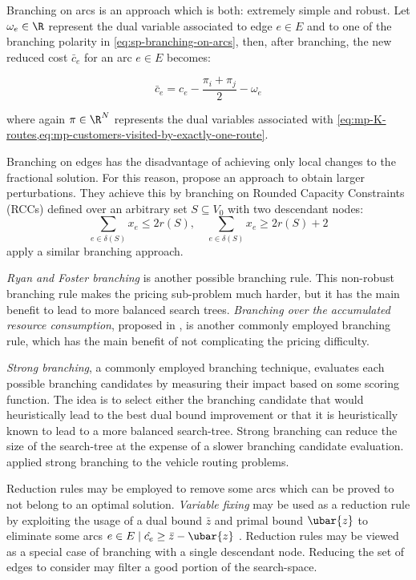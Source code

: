 Branching on arcs is an approach which is both: extremely simple and robust.
Let $\omega_e \in \R$ represent the dual variable associated to
edge $e \in E$ and to
one of the branching polarity in \cref{eq:sp-branching-on-arcs},
then, after branching,
the new reduced cost $\bar{c}_e$ for an arc $e \in E$ becomes:

\begin{equation}
\bar{c}_e = c_e - \frac{\pi_i + \pi_j}{2} - \omega_e
\end{equation}

where again $\pi \in \R^N$ represents the dual variables associated with \cref{eq:mp-K-routes,eq:mp-customers-visited-by-exactly-one-route}.

Branching on edges has the disadvantage of achieving only local changes
to the fractional solution.
For this reason, \textcite{augerat1998} propose an
approach to obtain larger perturbations.
They achieve this by branching on Rounded Capacity Constraints (RCCs) defined over
an arbitrary set $S \subseteq V_0$ with two descendant nodes:
\begin{equation}\label{eq:sp-branching-on-cutsets}
	\sum_{e \in \delta(S)}x_e \le 2 r(S), \quad
	\sum_{e \in \delta(S)}x_e \ge 2 r(S) + 2
\end{equation}
\textcite{pecin2017} apply a similar branching approach.

\textit{Ryan and Foster branching} \parencite{ryan1981} is another possible branching rule.
This non-robust branching rule makes the pricing sub-problem much harder,
but it has the main benefit to lead to more balanced search trees.
\textit{Branching over the accumulated resource consumption}, proposed in \textcite{gelinas1995new},
is another commonly employed branching rule, which has the main benefit of not complicating
the pricing difficulty.


\textit{Strong branching}, a commonly employed branching technique,
evaluates each possible branching candidates
by measuring their impact based on some scoring function.
The idea is to select either the branching candidate that
would heuristically lead to the best dual bound improvement
or that it is heuristically known to lead to a more balanced search-tree.
Strong branching can reduce the size of the search-tree
at the expense of a slower branching candidate evaluation.
\textcite{fukasawa2006, pecin2017a, pecin2017b} applied strong branching
to the vehicle routing problems.

\medskip

Reduction rules may be employed to remove some arcs
which can be proved to not belong to an optimal solution.
\textit{Variable fixing} may be used as a reduction rule by exploiting
the usage of a dual bound $\bar{z}$ and primal bound $\ubar{z}$ to eliminate some
arcs $e \in E \mid \hat{c_e} \ge \bar{z} - \ubar{z}$ \parencite{hadjar2006, irnich2010}.
Reduction rules may be viewed as a special case of branching
with a single descendant node.
Reducing the set of edges to consider may filter a good portion of the search-space.



